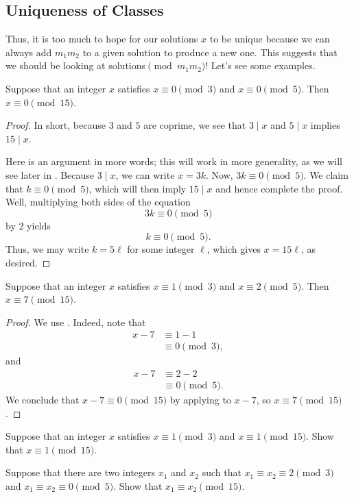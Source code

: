 \documentclass{article}
\begin{document}
\subsection{Uniqueness of Classes}
Thus, it is too much to hope for our solutions $x$ to be unique because we can always add $m_1m_2$ to a given solution to produce a new one. This suggests that we should be looking at solutions$\pmod{m_1m_2}$! Let's see some examples.
\begin{example} \label{ex:crt-uniq-mod-3-mod-5}
	Suppose that an integer $x$ satisfies $x\equiv0\pmod3$ and $x\equiv0\pmod5$. Then $x\equiv0\pmod{15}$.
\end{example}
\begin{proof}
	In short, because $3$ and $5$ are coprime, we see that $3\mid x$ and $5\mid x$ implies $15\mid x$.

	Here is an argument in more words; this will work in more generality, as we will see later in . Because $3\mid x$, we can write $x=3k$. Now, $3k\equiv0\pmod5$. We claim that $k\equiv0\pmod5$, which will then imply $15\mid x$ and hence complete the proof. Well, multiplying both sides of the equation
	\[3k\equiv0\pmod5\]
	by $2$ yields
	\[k\equiv0\pmod5.\]
	Thus, we may write $k=5\ell$ for some integer $\ell$, which gives $x=15\ell$, as desired.
\end{proof}
\begin{example} \label{ex:crt-uniq-mod-3-mod-5-nonzero}
	Suppose that an integer $x$ satisfies $x\equiv1\pmod3$ and $x\equiv2\pmod5$. Then $x\equiv7\pmod{15}$.
\end{example}
\begin{proof}
	We use . Indeed, note that
	\begin{align*}
		x-7 &\equiv 1-1 \\
		&\equiv0\pmod3,
	\end{align*}
	and
	\begin{align*}
		x-7 &\equiv 2-2 \\
		&\equiv 0\pmod5.
	\end{align*}
	We conclude that $x-7\equiv0\pmod{15}$ by applying  to $x-7$, so $x\equiv7\pmod{15}$.
\end{proof}
\begin{exe}
	Suppose that an integer $x$ satisfies $x\equiv1\pmod3$ and $x\equiv1\pmod{15}$. Show that $x\equiv1\pmod{15}$.
\end{exe}
\begin{exe}
	Suppose that there are two integers $x_1$ and $x_2$ such that $x_1\equiv x_2\equiv2\pmod{3}$ and $x_1\equiv x_2\equiv0\pmod5$. Show that $x_1\equiv x_2\pmod{15}$.
\end{exe}
\end{document}
